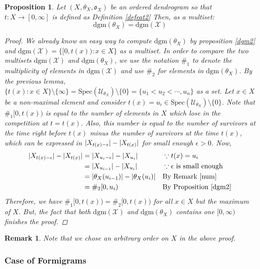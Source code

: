 \documentclass[a4paper,12pt]{article}
\newtheorem{remark}{Remark}[section]
\newtheorem{proposition}{Proposition}[section]
\newcommand{\dgm}{\mathrm{dgm}}
\DeclarePairedDelimiter{\abs}{\lvert}{\rvert}
\begin{document}
\begin{proposition} Let $(X,\theta_X, \mathfrak{o}_X)$ be an ordered dendrogram so that $t:X\rightarrow [0,\infty]$ is defined as Definition \ref{defeat2}
Then, as a multiset:
$$\dgm(\theta_X)=\dgm(\mathcal{X})$$
\begin{proof}
 We already know an easy way to compute $\dgm(\theta_X)$ by proposition \ref{dgm2} and $\dgm(\mathcal{X})=\{[0,t(x)): x\in X\}$ as a multiset. In order to compare the two multisets $\dgm(\mathcal{X})$ and $\dgm(\theta_X)$, we use the notation $\#_1$ to denote the multiplicity of elements in $\dgm(\mathcal{X})$ and use $\#_2$ for elements in $\dgm(\theta_X)$. By the previous lemma, $\{t(x):x \in X\}\setminus \{\infty\}=\mathrm{Spec}(\mathcal{U}_{\theta_X})\setminus \{0\}=\{u_1< u_2<\cdots, u_n\}$ as a set. Let $x\in X$ be a non-maximal element and consider $t(x)=u_i\in \mathrm{Spec}(\mathcal{U}_{\theta_X})\setminus \{0\}$. Note that $\#_1[0,t(x))$ is equal to the number of elements in $X$ which lose in the competition at $t=t(x)$. Also, this number is equal to the number of survivors at the time right before $t(x)$ minus the number of survivors at the time $t(x)$, which can be expressed in $\abs{X_{t(x)-\epsilon}}-\abs{X_{t(x)}}$ for small enough $\epsilon>0$. Now, 
\begin{align*}
\abs{X_{t(x)-\epsilon}}-\abs{X_{t(x)}}&=\abs{X_{u_i-\epsilon}}-\abs{X_{u_i}}&&\because t(x)=u_i\\&=\abs{X_{u_{i-1}}}-\abs{X_{u_i}}&&\because \epsilon \ \mbox{is small enough}\\&=\abs{\theta_X(u_{i-1})}-\abs{\theta_X(u_i)}&&\mbox{By Remark}\ \ref{num}\\&=\#_2[0,u_i) &&\mbox{By Proposition \ref{dgm2}}
\end{align*}
Therefore, we have $\#_1[0,t(x))=\#_2[0,t(x))$ for all $x\in X$ but the maximum of $X$. But, the fact that both $\dgm(\mathcal{X})$ and $\dgm({\theta_X})$ contains one $[0,\infty)$ finishes the proof.\end{proof}\label{dgm3}
\end{proposition}

\begin{remark}Note that we chose an arbitrary order on $X$ in the above proof.
\end{remark}

\subsubsection{Case of Formigrams}
\end{document}
